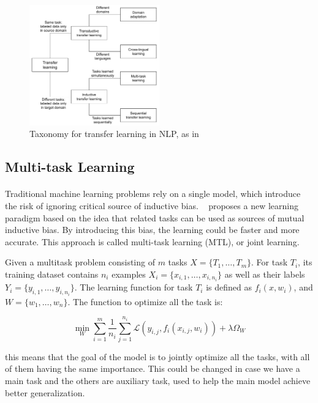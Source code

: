 \begin{figure}[]
        \centering
        \includegraphics[width=0.5\textwidth]{images/NLP_Transfer_Learning_Taxonomy.pdf}
        \caption{Taxonomy for transfer learning in NLP, as in~\citep{ruder2019neural}}
        \label{fig:nlp_transfer_taxonomy}
\end{figure}%


\subsection{Multi-task Learning}
\paragraph{}
Traditional machine learning problems rely on a single model, which introduce the risk of ignoring critical source of inductive bias. ~\cite{caruana1993mtl} proposes a new learning paradigm based on the idea that related tasks can be used as sources of mutual inductive bias. By introducing this bias, the learning could be faster and more accurate. This approach is called multi-task learning (MTL), or joint learning. 

Given a multitask problem consisting of $m$ tasks $X = \{T_{1}, \dots, T_{m}\}$. For task $T_i$, its training dataset contains $n_i$ examples $X_i = \{x_{i, 1}, \dots, x_{i, n_i}\}$ as well as their labels $Y_i = \{y_{i, 1}, \dots, y_{i, n_i}\}$. The learning function for task $T_i$ is defined as $f_i(x, w_i)$, and $W = \{w_1, \dots, w_n\}$. The function to optimize all the task is:

\begin{equation}
\min_{W} \sum_{i=1}^{m} \frac{1}{n_{i}} \sum_{j=1}^{n_{i}} \mathcal{L}\left(y_{i, j}, f_i(x_{i,j}, w_i)\right) + \lambda\Omega_W
\end{equation}

this means that the goal of the model is to jointly optimize all the tasks, with all of them having the same importance. This could be changed in case we have a main task and the others are auxiliary task, used to help the main model achieve better generalization.

